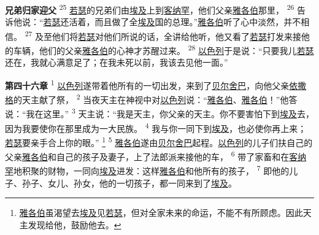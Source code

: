 \textbf{兄弟归家迎父\quad}
\textsuperscript{25}
\uline{若瑟}的兄弟们由\uline{埃及}上到\uline{客纳罕}，他们父亲\uline{雅各伯}那里，
\textsuperscript{26}
告诉他说：“\uline{若瑟}还活着，而且做了全\uline{埃及}国的总理。”\uline{雅各伯}听了心中淡然，并不相信。
\textsuperscript{27}
及至他们将\uline{若瑟}对他们所说的话，全讲给他听，他又看了\uline{若瑟}打发来接他的车辆，他们的父亲\uline{雅各伯}的心神才苏醒过来。
\textsuperscript{28}
\uline{以色列}于是说：“只要我儿\uline{若瑟}还在，我就心满意足了；在我未死以前，我该去见他一面。”

\textbf{第四十六章\quad}
\textsuperscript{1}
\uline{以色列}遂带着他所有的一切出发，来到了\uline{贝尔}\uline{舍巴}，向他父亲\uline{依撒格}的天主献了祭，
\textsuperscript{2}
当夜天主在神视中对\uline{以色列}说：“\uline{雅各伯}、\uline{雅各伯}！”他答说：“我在这里。”
\textsuperscript{3}
天主说：“我是天主，你父亲的天主。你不要害怕下到\uline{埃及}去，因为我要使你在那里成为一大民族。
\textsuperscript{4}
我与你一同下到\uline{埃及}，也必使你再上来；\uline{若瑟}要亲手合上你的眼。”
\footnote{\uline{雅各伯}虽渴望去\uline{埃及}见\uline{若瑟}，但对全家未来的命运，不能不有所顾虑。因此天主发现给他，鼓励他去。}
\textsuperscript{5}
\uline{雅各伯}遂由\uline{贝尔}\uline{舍巴}起程。\uline{以色列}的儿子们扶自己的父亲\uline{雅各伯}和自己的孩子及妻子，上了法郎派来接他的车，
\textsuperscript{6}
带了家畜和在\uline{客纳罕}地积聚的财物，一同向\uline{埃及}进发：这样\uline{雅各伯}和他所有的孩子，
\textsuperscript{7}
即他的儿子、孙子、女儿、孙女，他的一切孩子，都一同来到了\uline{埃及}。

